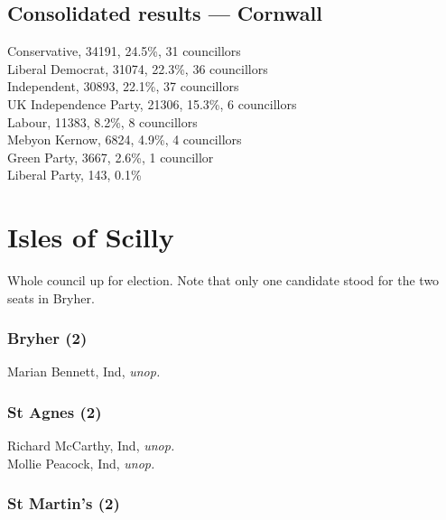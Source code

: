 \documentclass[a4paper,openany,10pt]{book}
\begin{document}
\subsection*{Consolidated results --- Cornwall}
Conservative, 34191, 24.5\%, 31 councillors\\
Liberal Democrat, 31074, 22.3\%, 36 councillors\\
Independent, 30893, 22.1\%, 37 councillors\\
UK Independence Party, 21306, 15.3\%, 6 councillors\\
Labour, 11383, 8.2\%, 8 councillors\\
Mebyon Kernow, 6824, 4.9\%, 4 councillors\\
Green Party, 3667, 2.6\%, 1 councillor\\
Liberal Party, 143, 0.1\% \\


\vfill

\section{Isles of Scilly}

Whole council up for election. Note that only one candidate stood for the two seats in Bryher.

\subsubsection*{Bryher (2)}



Marian Bennett, Ind, \emph{unop.}\\


\subsubsection*{St Agnes (2)}



Richard McCarthy, Ind, \emph{unop.}\\
Mollie Peacock, Ind, \emph{unop.}\\


\subsubsection*{St Martin's (2)}

\end{document}
